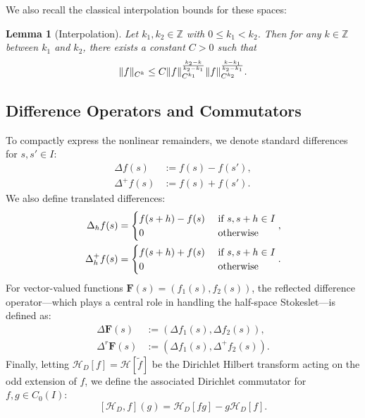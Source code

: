 \documentclass{amsart}
\newtheorem{lemma}[theorem]{Lemma}
\begin{document}
We also recall the classical interpolation bounds for these spaces:
\begin{lemma}[Interpolation]\label{lem:interpolation}
Let $k_1,k_2 \in \mathbb{Z}$ with $0\leq k_1 < k_2$. Then for any $k \in \mathbb{Z}$ between $k_1$ and $k_2$, there exists a constant $C>0$ such that
\[
\| f \|_{C^k} \leq C \| f\|_{C^{k_1}}^{k_2 - k \over k_2 - k_1} \| f\|_{C^{k_2}}^{k - k_1 \over k_2 - k_1} .
\]
\end{lemma}

\subsection{Difference Operators and Commutators}

To compactly express the nonlinear remainders, we denote standard differences for $s,s' \in I$:
\begin{align*}
\Delta f (s) & := f(s) - f(s'), \\
\Delta^+ f (s) & := f(s) + f(s').
\end{align*}
We also define translated differences:
\begin{align*}
\Delta_h f (s) & = \begin{cases} 
f(s+h) - f(s) & \hbox{ if } s,s+h \in I \\
0 &\hbox{ otherwise }
\end{cases}, \\
\Delta^+_h f (s) & = \begin{cases} 
f(s+h) + f(s) & \hbox{ if } s,s+h \in I \\
0 &\hbox{ otherwise }
\end{cases}.
\end{align*}
For vector-valued functions $\mathbf{F}(s) = (f_1(s), f_2(s))$, the reflected difference operator—which plays a central role in handling the half-space Stokeslet—is defined as:
\begin{align*}
\Delta \mathbf{F}(s) & := (\Delta f_1(s), \Delta f_2(s)), \\
\Delta^r \mathbf{F}(s) & := (\Delta f_1(s), \Delta^+ f_2(s)).
\end{align*}
Finally, letting $\mathcal{H}_D[f] = \mathcal{H}[\widetilde{f}]$ be the Dirichlet Hilbert transform acting on the odd extension of $f$, we define the associated Dirichlet commutator for $f, g \in C_0(I)$:
\begin{equation}
\left[ \mathcal{H}_D , f \right](g) 
= \mathcal{H}_D\left[ f g \right] - g \mathcal{H}_D[f].
\end{equation}
\end{document}
